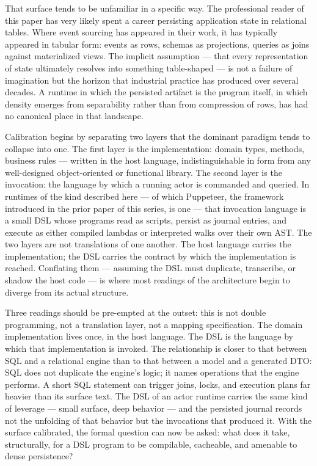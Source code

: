 \documentclass[
]{article}
\begin{document}
That surface tends to be unfamiliar in a specific way. The professional
reader of this paper has very likely spent a career persisting
application state in relational tables. Where event sourcing has
appeared in their work, it has typically appeared in tabular form:
events as rows, schemas as projections, queries as joins against
materialized views. The implicit assumption --- that every
representation of state ultimately resolves into something table-shaped
--- is not a failure of imagination but the horizon that industrial
practice has produced over several decades. A runtime in which the
persisted artifact is the program itself, in which density emerges from
separability rather than from compression of rows, has had no canonical
place in that landscape.

Calibration begins by separating two layers that the dominant paradigm
tends to collapse into one. The first layer is the implementation:
domain types, methods, business rules --- written in the host language,
indistinguishable in form from any well-designed object-oriented or
functional library. The second layer is the invocation: the language by
which a running actor is commanded and queried. In runtimes of the kind
described here --- of which Puppeteer, the framework introduced in the
prior paper of this series, is one --- that invocation language is a
small DSL whose programs read as scripts, persist as journal entries,
and execute as either compiled lambdas or interpreted walks over their
own AST. The two layers are not translations of one another. The host
language carries the implementation; the DSL carries the contract by
which the implementation is reached. Conflating them --- assuming the
DSL must duplicate, transcribe, or shadow the host code --- is where
most readings of the architecture begin to diverge from its actual
structure.

Three readings should be pre-empted at the outset: this is not double
programming, not a translation layer, not a mapping specification. The
domain implementation lives once, in the host language. The DSL is the
language by which that implementation is invoked. The relationship is
closer to that between SQL and a relational engine than to that between
a model and a generated DTO: SQL does not duplicate the engine's logic;
it names operations that the engine performs. A short SQL statement can
trigger joins, locks, and execution plans far heavier than its surface
text. The DSL of an actor runtime carries the same kind of leverage ---
small surface, deep behavior --- and the persisted journal records not
the unfolding of that behavior but the invocations that produced it.
With the surface calibrated, the formal question can now be asked: what
does it take, structurally, for a DSL program to be compilable,
cacheable, and amenable to dense persistence?
\end{document}
